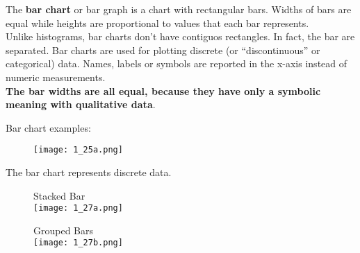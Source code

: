 \begin{frame}
  \vspace*{.25cm}
  The \textbf{bar chart} or bar graph is a chart with rectangular bars. Widths of bars are equal while heights are proportional to values that each bar represents. \\
  \vspace*{.25cm}
  Unlike histograms, bar charts don't have contiguos rectangles. In fact, the bar are separated. Bar charts are used for plotting discrete (or ``discontinuous'' or categorical) data. Names, labels or symbols are reported in the x-axis instead of numeric measurements. \\
  \vspace*{.25cm}
  \textbf{The bar widths are all equal, because they have only a symbolic meaning with qualitative data}. \\
\end{frame}

\begin{frame}
  \vspace*{0.35cm}
  Bar chart examples:\\
  \vspace*{.35cm}
  \begin{figure}
    \centering
    \texttt{[image: 1\_25a.png]} \qquad \qquad
  \end{figure}
\end{frame}

\begin{frame}
  \vspace*{0.5cm}
  The bar chart represents discrete data. \\
  \vspace{1cm}
  \begin{figure}
    \begin{minipage}[t]{.40\textwidth}
      \begin{center}
        Stacked Bar \\
        \vspace{0.5cm}
        \texttt{[image: 1\_27a.png]}
      \end{center}
    \end{minipage}%
    \hspace{10mm}%
    \begin{minipage}[t]{.40\textwidth}
      \begin{center}
        Grouped Bars \\
        \vspace{0.5cm}
        \texttt{[image: 1\_27b.png]}
      \end{center}
    \end{minipage}
  \end{figure}
\end{frame}


